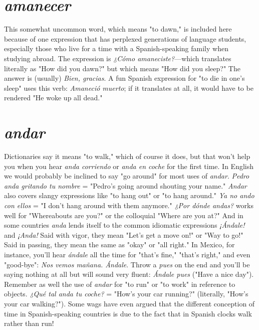 \documentclass[14pt,a4paper,oneside]{memoir}
\begin{document}
\section{\emph{amanecer}}

This somewhat uncommon word, which means "to dawn," is
included here because of one expression that has perplexed generations
of language students, especially those who live for a time with a
Spanish-speaking family when studying abroad. The expression is
\emph{¿Cómo amaneciste?}---which translates literally as "How did you
dawn?" but which means "How did you sleep?" The answer is (usually) \emph{Bien, gracias}. A fun Spanish expression for "to die in one's sleep"
uses this verb: \emph{Amaneció muerto}; if it translates at all, it would have
to be rendered "He woke up all dead."

\section{\emph{andar}}

Dictionaries say it means "to walk," which of course it does,
but that won't help you when you hear \emph{anda corriendo} or \emph{anda en
	coche} for the first time. In English we would probably be inclined
to say "go around" for most uses of \emph{andar}. \emph{Pedro anda gritando tu
	nombre} = "Pedro's going around shouting your name." \emph{Andar} also
covers slangy expressions like "to hang out" or "to hang around." \emph{Ya
	no ando con ellos} = "I don't hang around with them anymore." \emph{¿Por
	dónde andas?} works well for "Whereabouts are you?" or the colloquial
"Where are you at?" And in some countries \emph{anda} lends itself to the
common idiomatic expressions \emph{¡Ándale!} and \emph{¡Anda!} Said with vigor,
they mean "Let's get a move on!" or "Way to go!" Said in passing, they
mean the same as "okay" or "all right." In Mexico, for instance, you'll
hear \emph{ándale} all the time for "that's fine," "that's right," and even
"good-bye": \emph{Nos vemos mañana. Ándale}. Throw a \emph{pues} on the end
and you'll be saying nothing at all but will sound very fluent: \emph{Ándale
	pues} ("Have a nice day"). Remember as well the use of \emph{andar} for "to
run" or "to work" in reference to objects. \emph{¿Qué tal anda tu coche?} =
"How's your car running?" (literally, "How's your car walking?").
Some wags have even argued that the different conception of time in
Spanish-speaking countries is due to the fact that in Spanish clocks
walk rather than run!
\end{document}
